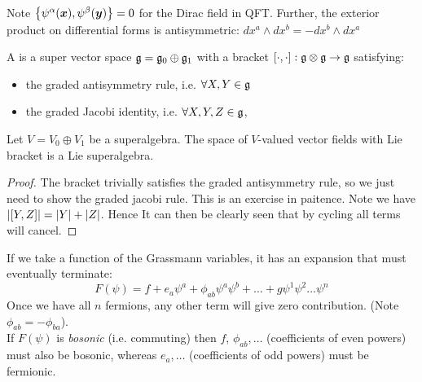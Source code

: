 \documentclass{article}
\begin{document}
\begin{example}
	Note $\acomm[\psi^\alpha(\bm{x})]{\psi^\beta(\bm{y})} = 0$ for the Dirac field in QFT. Further, the exterior product on differential forms is antisymmetric: $dx^a \wedge dx^b = -dx^b \wedge dx^a$
\end{example}

\begin{definition}
	A  is a super vector space $\mf{g} = \mf{g}_0 \oplus \mf{g}_1$ with a bracket $\comm[\cdot]{\cdot} : \mf{g}\otimes \mf{g} \to \mf{g}$ satisfying:
	\begin{itemize}
		\item the graded antisymmetry rule, i.e. $\forall X,Y \in \mf{g}$ 
\item the graded Jacobi identity, i.e. $\forall X,Y,Z \in \mf{g}$, 
	\end{itemize}
\end{definition}

\begin{prop}
	Let $V = V_0 \oplus V_1$ be a superalgebra. The space of $V$-valued vector fields with Lie bracket 
is a Lie superalgebra.
\end{prop}
\begin{proof}
	The bracket trivially satisfies the graded antisymmetry rule, so we just need to show the graded jacobi rule. This is an exercise in paitence. Note we have $\abs{\comm[Y]{Z}} = \abs{Y}+\abs{Z}$. Hence
It can then be clearly seen that by cycling all terms will cancel.
\end{proof}
If we take a function of the Grassmann variables, it has an expansion that must eventually terminate: 
\[
F(\psi) = f + e_a \psi^a + \phi_{ab} \psi^a \psi^b + \dots +g \psi^1\psi^2\dots\psi^n
\]
Once we have all $n$ fermions, any other term will give zero contribution. (Note $\phi_{ab} = -\phi_{ba}$). \\
If $F(\psi)$ is \emph{bosonic} (i.e. commuting) then $f$, $\phi_{ab},\dots$ (coefficients of even powers) must also be bosonic, whereas $e_a,\dots$ (coefficients of odd powers) must be fermionic. 
\end{document}
